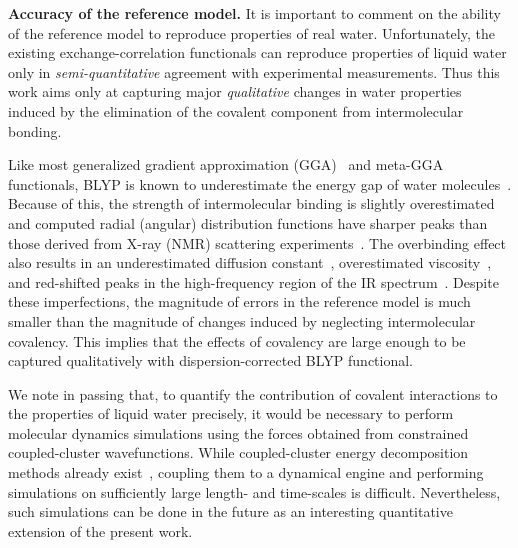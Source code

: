 \documentclass[journal=jacsat,manuscript=article]{achemso}
\begin{document}
\textbf{Accuracy of the reference model.} It is important to comment on the ability of the reference model to reproduce properties of real water. 
Unfortunately, the existing exchange-correlation functionals can reproduce properties of liquid water only in \emph{semi-quantitative} agreement with experimental measurements. 
Thus this work aims only at capturing major \emph{qualitative} changes in water properties induced by the elimination of the covalent component from intermolecular bonding. 

Like most generalized gradient approximation (GGA)~\cite{ZZZ} and meta-GGA~\cite{PNAS2017} functionals, BLYP is known to underestimate the energy gap of water molecules~\cite{JPCL2012}.
Because of this, the strength of intermolecular binding is slightly overestimated and computed radial (angular) distribution functions have sharper peaks than those derived from X-ray (NMR) scattering experiments~\cite{gillan2016perspective, ma2012ab}.
The overbinding effect also results in an underestimated diffusion constant~\cite{ZZZ}, overestimated viscosity~\cite{ZZZ}, and red-shifted peaks in the high-frequency region of the IR spectrum~\cite{ZZZ}. 
Despite these imperfections, the magnitude of errors in the reference model is much smaller than the magnitude of changes induced by neglecting intermolecular covalency. 
This implies that the effects of covalency are large enough to be captured qualitatively with dispersion-corrected BLYP functional. 

We note in passing that, to quantify the contribution of covalent interactions to the properties of liquid water precisely, it would be necessary to perform molecular dynamics simulations using the forces obtained from constrained coupled-cluster wavefunctions. While coupled-cluster energy decomposition methods already exist~\cite{azar2012,azar2015}, coupling them to a dynamical engine and performing simulations on sufficiently large length- and time-scales is difficult. Nevertheless, such simulations can be done in the future as an interesting quantitative extension of the present work.
\end{document}
